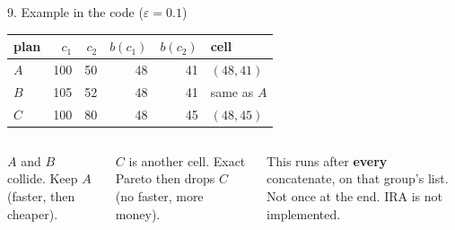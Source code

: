 \documentclass[aspectratio=169,11pt]{beamer}
\begin{document}
\begin{frame}{9. Example in the code (\(\varepsilon=0.1\))}

\centering
\renewcommand{\arraystretch}{1.18}
\setlength{\tabcolsep}{8pt}
{\small
\begin{tabular}{@{}lrrrrl@{}}
\toprule
plan & \(c_1\) & \(c_2\) & \(b(c_1)\) & \(b(c_2)\) & cell \\
\midrule
\(A\) & 100 & 50 & 48 & 41 & \((48,41)\) \\
\(B\) & 105 & 52 & 48 & 41 & same as \(A\) \\
\(C\) & 100 & 80 & 48 & 45 & \((48,45)\) \\
\bottomrule
\end{tabular}}

\vspace{0.32cm}
\begin{columns}[T]
{\small
\(A\) and \(B\) collide. Keep \(A\) (faster, then cheaper).

\vspace{0.18cm}
\(C\) is another cell. Exact Pareto then drops \(C\) (no faster, more money).

\vspace{0.22cm}
{\scriptsize This runs after \textbf{every} concatenate, on that group's list. Not once at the end. IRA is not implemented.}}
\centering
{}
\end{columns}
\end{frame}
\end{document}
